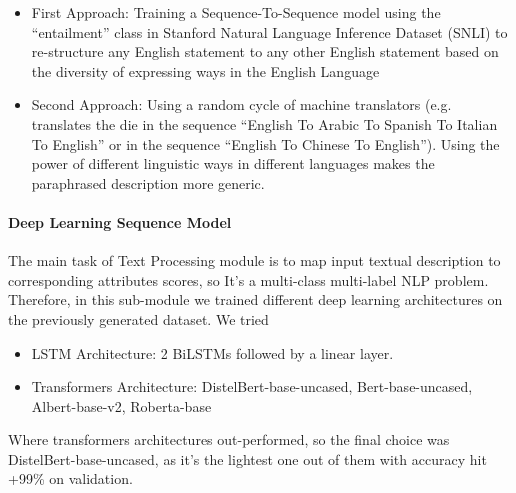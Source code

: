 \begin{enumerate}
    \begin{itemize}
        \item First Approach: Training a Sequence-To-Sequence model using the “entailment” class in Stanford Natural Language Inference Dataset (SNLI) to re-structure any English statement to any other English statement based on the diversity of expressing ways in the English Language
        \item Second Approach: Using a random cycle of machine translators (e.g. translates the die in the sequence “English To Arabic To Spanish To Italian To English” or in the sequence “English To Chinese To English”). Using the power of different linguistic ways in different languages makes the paraphrased description more generic. 
    \end{itemize}
\end{enumerate}

\paragraph{Deep Learning Sequence Model}

The main task of Text Processing module is to map input textual description to corresponding attributes scores, so It’s a multi-class multi-label NLP problem. Therefore, in this sub-module we trained different deep learning architectures on the previously generated dataset. We tried 

\begin{itemize}
    \item LSTM Architecture: 2 BiLSTMs followed by a linear layer.
    \item Transformers Architecture: DistelBert-base-uncased, Bert-base-uncased, Albert-base-v2, Roberta-base
\end{itemize}

Where transformers architectures out-performed, so the final choice was DistelBert-base-uncased, as it’s the lightest one out of them with accuracy hit +99\% on validation.



